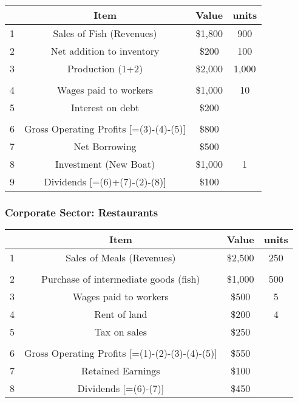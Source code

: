 \documentclass[12pt, letterpaper]{article}
\begin{document}
{\begin{center}
	\begin{tabular}{|c|c|c|c|}
	\hline
	& Item & Value & units\\
	\hline
	1 & Sales of Fish (Revenues) & \$1,800 & 900\\
	\hline
	2 & Net addition to inventory & \$200 & 100\\
	\hline
	3 & Production (1+2) & \$2,000 & 1,000 \\
	\hline
	& & &\\
	\hline
	4 & Wages paid to workers & \$1,000 & 10\\
	\hline
	5 & Interest on debt & \$200 & \\
	\hline
	& & &\\
	\hline
	6 & Gross Operating Profits [=(3)-(4)-(5)] & \$800 & \\
	\hline
	7 & Net Borrowing & \$500 & \\
	\hline
	8 & Investment (New Boat) & \$1,000 & 1 \\
	\hline
	9 & Dividends [=(6)+(7)-(2)-(8)] & \$100 & \\
	\hline
	\end{tabular}
\end{center}

\subsubsection{Corporate Sector: Restaurants}

\begin{center}
	\begin{tabular}{|c|c|c|c|}
	\hline
	& Item & Value & units\\
	\hline
	1 & Sales of Meals (Revenues) & \$2,500 & 250\\
	\hline
	&&&\\
	\hline
	2 & Purchase of intermediate goods (fish) & \$1,000 & 500\\
	\hline
	3 & Wages paid to workers & \$500 & 5 \\
	\hline
	4 & Rent of land & \$200 & 4\\
	\hline
	5 & Tax on sales & \$250 & \\
	\hline
	& & &\\
	\hline
	6 & Gross Operating Profits [=(1)-(2)-(3)-(4)-(5)] & \$550 & \\
	\hline
	7 & Retained Earnings & \$100 & \\
	\hline
	8 & Dividends [=(6)-(7)] & \$450 & \\
	\hline
	\end{tabular}
\end{center}

}
\end{document}
